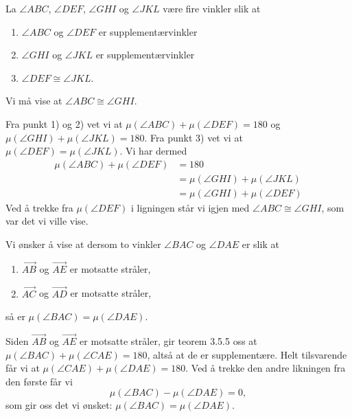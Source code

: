 \begin{oppgave}[3.5.4]
    La $\angle ABC$, $\angle DEF$, $\angle GHI$ og $\angle JKL$ være fire vinkler slik at 
    \begin{enumerate}[label = \arabic*)]
        \item $\angle ABC$ og $\angle DEF$ er supplementærvinkler
        \item $\angle GHI$ og $\angle JKL$ er supplementærvinkler
        \item $\angle DEF \cong \angle JKL$. 
    \end{enumerate}
    Vi må vise at $\angle ABC \cong \angle GHI$. 

    Fra punkt 1) og 2) vet vi at $\mu(\angle ABC)+\mu(\angle DEF) = 180$ og 
    $\mu(\angle GHI)+\mu(\angle JKL) = 180$. Fra punkt 3) vet vi at $\mu(\angle DEF)=\mu(\angle JKL)$. 
    Vi har dermed 
    \begin{align*}
        \mu(\angle ABC)+\mu(\angle DEF) 
        &= 180 \\
        &= \mu(\angle GHI)+\mu(\angle JKL) \\
        &= \mu(\angle GHI)+ \mu(\angle DEF)
    \end{align*} 
    Ved å trekke fra $\mu(\angle DEF)$ i ligningen står vi igjen med $\angle ABC \cong \angle GHI$, 
    som var det vi ville vise. 
\end{oppgave}

\begin{oppgave}[3.5.5]
    Vi ønsker å vise at dersom to vinkler $\angle BAC$ og $\angle DAE$ er slik at 
    \begin{enumerate}[label=\arabic*)]
        \item $\overrightarrow{AB}$ og $\overrightarrow{AE}$ er motsatte stråler,
        \item $\overrightarrow{AC}$ og $\overrightarrow{AD}$ er motsatte stråler,
    \end{enumerate}
    så er $\mu(\angle BAC)=\mu(\angle DAE)$. 

    Siden $\overrightarrow{AB}$ og $\overrightarrow{AE}$ er motsatte stråler, gir teorem 3.5.5 oss at 
    $\mu(\angle BAC)+\mu(\angle CAE)=180$, altså at de er supplementære. Helt tilsvarende får vi at 
    $\mu(\angle CAE)+\mu(\angle DAE)=180$. Ved å trekke den andre likningen fra den første får vi 
    $$\mu(\angle BAC)-\mu(\angle DAE) = 0,$$
    som gir oss det vi ønsket: $\mu(\angle BAC)=\mu(\angle DAE)$. 
\end{oppgave}

